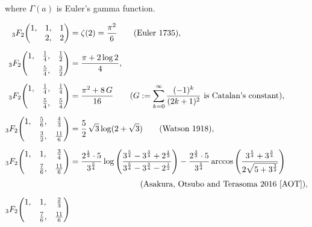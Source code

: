 \documentclass[a4paper,12pt]{article}
\theoremstyle{plain}
\def\vG{\varGamma}
\begin{document}
where $\vG( a )$ is Euler's gamma function.  
\begin{table}[t]
\begin{align*}
{}_3F_2\! 
\begin{pmatrix} 
1, & 1, & 1 \\ 
   & 2, & 2    
\end{pmatrix} &= \zeta(2) = \dfrac{\pi^2}{6} \qquad \mbox{(Euler 1735)}, \\[2mm]
{}_3F_2\! 
\begin{pmatrix} 
1, & \frac{1}{4}, & \frac{1}{2} \\[2mm] 
   & \frac{5}{4}, & \frac{3}{2}    
\end{pmatrix} &= \dfrac{\pi + 2 \log 2}{4}, \\[2mm]
{}_3F_2\! 
\begin{pmatrix} 
1, & \frac{1}{4}, & \frac{1}{4} \\[2mm] 
   & \frac{5}{4}, & \frac{5}{4}    
\end{pmatrix} &= \dfrac{\pi^2 + 8 \, G}{16} \qquad 
\mbox{($G := \displaystyle \sum_{k=0}^{\infty} \frac{(-1)^k}{(2k+1)^2}$ is Catalan's constant)}, \\[2mm]
{}_3F_2\! 
\begin{pmatrix} 
1, & \frac{5}{6}, & \frac{4}{3} \\[2mm] 
   &  \frac{3}{2}, & \frac{11}{6}
\end{pmatrix} &= \frac{5}{2} \, \sqrt{3} \log(2+\sqrt{3}) \qquad \mbox{(Watson 1918)}, \\[2mm]
{}_3F_2\!
\begin{pmatrix}
1, & 1, & \frac{3}{4} \\[2mm]
   & \frac{7}{6}, & \frac{11}{6}
\end{pmatrix}
&=\frac{2^{\frac{1}{2}} \cdot 5}{ 3^{ \frac{5}{4} } }
\log\left( \frac{3^{\frac{5}{4}}-3^{\frac{3}{4}} + 2^{\frac{1}{2} } }{ 3^{\frac{5}{4}} 
-3^{\frac{3}{4}}-2^{\frac{1}{2} }}\right)  -\frac{2^{\frac{3}{2} } \cdot 5 }{ 3^{\frac{5}{4} } } \arccos
\left(\frac{3^{\frac{5}{4}}+3^{\frac{3}{4}}}{2\sqrt{5+ 3^{\frac{3}{2} } }}\right) \\[1mm]
& \hspace{3cm} \mbox{(Asakura, Otsubo and Terasoma 2016 \cite{AOT})},\\[2mm]
{}_3F_2\! 
\begin{pmatrix} 
1, & 1, & \frac{2}{3} \\[2mm] 
   & \frac{7}{6}, & \frac{11}{6}    

\end{pmatrix}
\end{align*}
\end{table}
\end{document}
